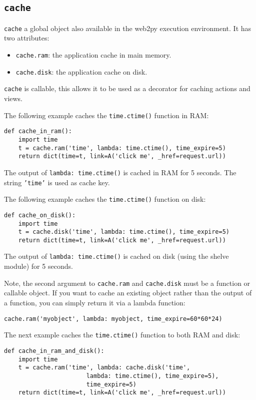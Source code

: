 \documentclass[justified,sixbynine,notoc]{tufte-book}
\def\ft{\small\tt}
\def\inxx#1{\index{#1}}
\begin{document}
\begin{fullwidth}
\goodbreak\section{{\ft cache}}

\inxx{cache} \inxx{cache.ram} \inxx{cache.disk}
{\ft cache} a global object also available in the web2py execution environment. It has two attributes:
\begin{itemize}
\item {\ft cache.ram}: the application cache in main memory.

\item {\ft cache.disk}: the application cache on disk.
\end{itemize}
{\ft cache} is callable, this allows it to be used as a decorator for caching actions and views.

The following example caches the {\ft time.ctime()} function in RAM:
\begin{lstlisting}
def cache_in_ram():
    import time
    t = cache.ram('time', lambda: time.ctime(), time_expire=5)
    return dict(time=t, link=A('click me', _href=request.url))
\end{lstlisting}

The output of {\ft lambda: time.ctime()} is cached in RAM for 5 seconds. The string {\ft 'time'} is used as cache key.

The following example caches the {\ft time.ctime()} function on disk:
\begin{lstlisting}
def cache_on_disk():
    import time
    t = cache.disk('time', lambda: time.ctime(), time_expire=5)
    return dict(time=t, link=A('click me', _href=request.url))
\end{lstlisting}

The output of {\ft lambda: time.ctime()} is cached on disk (using the shelve module) for 5 seconds.

Note, the second argument to {\ft cache.ram} and {\ft cache.disk} must be a function or callable object. If you want to cache an existing object rather than the output of a function, you can simply return it via a lambda function:
\begin{lstlisting}
cache.ram('myobject', lambda: myobject, time_expire=60*60*24)
\end{lstlisting}

The next example caches the {\ft time.ctime()} function to both RAM and disk:
\begin{lstlisting}
def cache_in_ram_and_disk():
    import time
    t = cache.ram('time', lambda: cache.disk('time',
                       lambda: time.ctime(), time_expire=5),
                       time_expire=5)
    return dict(time=t, link=A('click me', _href=request.url))
\end{lstlisting}


\end{fullwidth}
\end{document}
